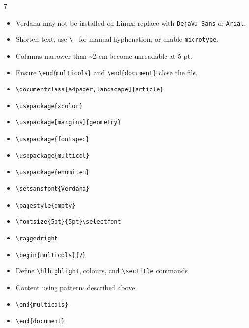\documentclass[a4paper,landscape]{article}
\begin{document}
\begin{multicols}{7}
\begin{itemize}
\item {} Verdana may not be installed on Linux; replace with \texttt{DejaVu Sans} or \texttt{Arial}.
\item {} Shorten text, use \texttt{\textbackslash-} for manual hyphenation, or enable \texttt{microtype}.
\item {} Columns narrower than \~{}2 cm become unreadable at 5 pt.
\item {} Ensure \texttt{\textbackslash end\{multicols\}} and \texttt{\textbackslash end\{document\}} close the file.
\end{itemize}



\begin{itemize}
\item \lbl{\checkmark} \texttt{\textbackslash documentclass[a4paper,landscape]\{article\}}
\item \lbl{\checkmark} \texttt{\textbackslash usepackage\{xcolor\}}
\item \lbl{\checkmark} \texttt{\textbackslash usepackage[margins]\{geometry\}}
\item \lbl{\checkmark} \texttt{\textbackslash usepackage\{fontspec\}}
\item \lbl{\checkmark} \texttt{\textbackslash usepackage\{multicol\}}
\item \lbl{\checkmark} \texttt{\textbackslash usepackage\{enumitem\}}
\item \lbl{\checkmark} \texttt{\textbackslash setsansfont\{Verdana\}}
\item \lbl{\checkmark} \texttt{\textbackslash pagestyle\{empty\}}
\end{itemize}

\begin{itemize}
\item \lbl{\checkmark} \texttt{\textbackslash fontsize\{5pt\}\{5pt\}\textbackslash selectfont}
\item \lbl{\checkmark} \texttt{\textbackslash raggedright}
\item \lbl{\checkmark} \texttt{\textbackslash begin\{multicols\}\{7\}}
\item \lbl{\checkmark} Define \texttt{\textbackslash hlhighlight}, colours, and \texttt{\textbackslash sectitle} commands
\item \lbl{\checkmark} Content using patterns described above
\item \lbl{\checkmark} \texttt{\textbackslash end\{multicols\}}
\item \lbl{\checkmark} \texttt{\textbackslash end\{document\}}
\end{itemize}


\end{multicols}
\end{document}
